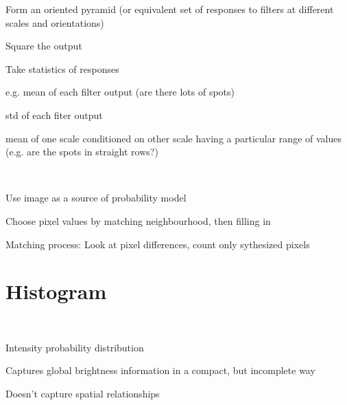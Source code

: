 \begin{compactdesc}
\begin{enumerate*}[label=\protect\circled{\arabic*},itemjoin=]
			\item Form an oriented pyramid (or equivalent set of responses to filters at different scales and orientations)\\
			\item Square the output\\
			\item Take statistics of responses\\
				\begin{enumerate*}[label=\quad\protect\circled{\alph*},itemjoin=]
					\item e.g. mean of each filter output (are there lots of spots)\\
					\item std of each fiter output\\
					\item mean of one scale conditioned on other scale having a particular range of values (e.g. are the spots in straight rows?)
				\end{enumerate*}
		\end{enumerate*}
	\item[\lp{Texture synthesis}] \hfill\\
		\begin{enumerate*}[label=\protect\circled{\arabic*},itemjoin=]
			\item Use image as a source of probability model\\
			\item Choose pixel values by matching neighbourhood, then filling in\\
			\item Matching process: Look at pixel differences, count only sythesized pixels
		\end{enumerate*}
\section{Histogram}
	\item[\lp{Principle}] \hfill\\
		\begin{enumerate*}[label=\protect\circled{\arabic*},itemjoin=]
			\item Intensity probability distribution\\
			\item Captures global brightness information in a compact, but incomplete way\\
			\item Doesn't capture spatial relationships
		\end{enumerate*}
\end{compactdesc}
